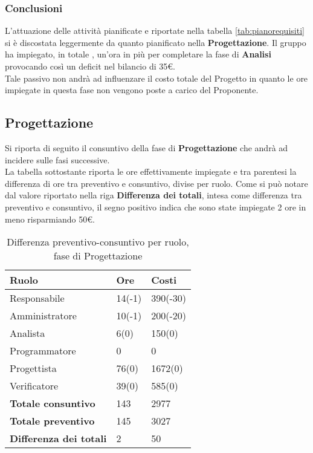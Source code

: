 \subsubsection{Conclusioni}
L'attuazione delle attività pianificate e riportate nella tabella \ref{tab:pianorequisiti} si è discostata leggermente da quanto pianificato nella \textbf{Progettazione}.
Il gruppo ha impiegato, in totale , un'ora in più per completare la fase di \textbf{Analisi} provocando così un deficit nel bilancio di 35\euro.\\
Tale passivo non andrà ad influenzare il costo totale del Progetto in quanto le ore impiegate in questa fase non vengono poste a carico del Proponente.

\subsection{Progettazione}

Si riporta di seguito il consuntivo della fase di \textbf{Progettazione} che andrà ad incidere sulle fasi successive.\\
La tabella sottostante riporta le ore effettivamente impiegate e tra parentesi la differenza di ore tra preventivo e consuntivo, divise per ruolo. Come si può notare dal valore riportato nella riga \textbf{Differenza dei totali}, intesa come differenza tra preventivo e consuntivo, il segno positivo indica che sono state impiegate 2 ore in meno risparmiando 50\euro.

	\begin{table}[H]
		\centering
	  \begin{tabular}{p{}p{}
		    							p{}}
		   \toprule Ruolo & Ore & Costi \\
		   \midrule
		   Responsabile & 14(-1) & 390(-30) \\
		   Amministratore & 10(-1) & 200(-20) \\
		   Analista & 6(0) & 150(0) \\
		   Programmatore & 0 & 0 \\
		   Progettista & 76(0) & 1672(0) \\
		   Verificatore & 39(0) & 585(0) \\
		   \hline
		   \textbf{Totale consuntivo} & 143 & 2977 \\
		   \textbf{Totale preventivo} & 145 & 3027 \\
		   \textbf{Differenza dei totali} & 2 & 50 \\
		   \bottomrule
	 \end{tabular}
	 	\label{tab:costuntivoProgettazione}
	 	\caption{Differenza preventivo-consuntivo per ruolo, fase di Progettazione}
	\end{table}

